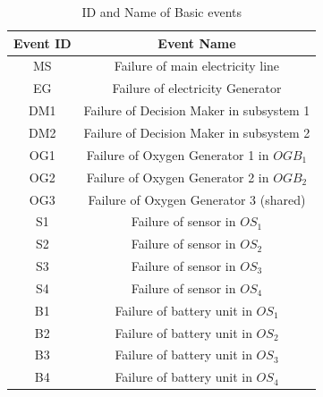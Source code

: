 \documentclass[10pt]{llncs}
\begin{document}
\begin{table}[thpb]
\renewcommand{\arraystretch}{1.5}
\caption{ID and Name of Basic events}
\label{table1}
\centering
\begin{tabular}{c   c}
\hline
\bfseries Event ID & \bfseries Event Name\\
\hline
MS & Failure of main electricity line\\
EG & Failure of electricity Generator\\
DM1 & Failure of Decision Maker in subsystem 1\\
DM2 & Failure of Decision Maker in subsystem 2\\
OG1 & Failure of Oxygen Generator 1 in ${OGB}_1$\\
OG2 & Failure of Oxygen Generator 2 in ${OGB}_2$\\
OG3 & Failure of Oxygen Generator 3 (shared)\\
S1 & Failure of sensor in $OS_1$\\
S2 & Failure of sensor in $OS_2$\\
S3 & Failure of sensor in $OS_3$\\
S4 & Failure of sensor in $OS_4$\\
B1 & Failure of battery unit in $OS_1$\\
B2 & Failure of battery unit in $OS_2$\\
B3 & Failure of battery unit in $OS_3$\\
B4 & Failure of battery unit in $OS_4$\\
\hline
\end{tabular}
\end{table}
\end{document}
